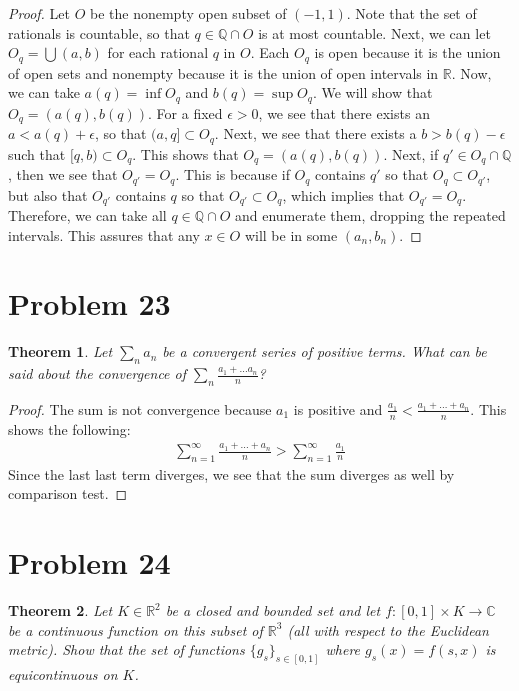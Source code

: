 \documentclass[psamsfonts]{amsart}
\newtheorem{thm}{Theorem}[section]
\theoremstyle{definition}
\theoremstyle{remark}
\numberwithin{equation}{section}
\begin{document}
\begin{proof}
Let $O$ be the nonempty open subset of $(-1,1)$. Note that the set of rationals is countable, so that $q \in \mathbb{Q} \cap O$ is at most countable. Next, we can let $O_q = \bigcup (a,b)$ for each rational $q$ in $O$. Each $O_q$ is open because it is the union of open sets and nonempty because it is the union of open intervals in $\mathbb{R}$. Now, we can take $a(q) = \inf O_q$ and $b(q) = \sup O_q$. We will show that $O_q = (a(q), b(q))$. For a fixed $\epsilon > 0$, we see that there exists an $a < a(q) + \epsilon$, so that $(a,q] \subset O_q$. Next, we see that there exists a $b > b(q) - \epsilon$ such that $[q,b) \subset O_q$. This shows that $O_q = (a(q),b(q))$. Next, if $q' \in O_q \cap \mathbb{Q}$, then we see that $O_{q'} = O_q$. This is because if $O_q$ contains $q'$ so that $O_q \subset O_{q'}$, but also that $O_{q'}$ contains $q$ so that $O_{q'} \subset O_q$, which implies that $O_{q'} = O_q$. Therefore, we can take all $q \in \mathbb{Q} \cap O$ and enumerate them, dropping the repeated intervals. This assures that any $x \in O$ will be in some $(a_n,b_n)$. 
\end{proof}

\section{Problem 23}

\begin{thm}
Let $\sum_{n} a_n$ be a convergent series of positive terms. What can be said about the convergence of $\sum_{n} \frac{a_1 + \ldots a_n}{n}$?
\end{thm}

\begin{proof}
The sum is not convergence because $a_1$ is positive and $\frac{a_1}{n} < \frac{a_1 + \ldots + a_n}{n}$. This shows the following:
\begin{eqnarray}
\sum_{n=1}^\infty \frac{a_1 + \ldots + a_n}{n} > \sum_{n=1}^\infty \frac{a_1}{n} 
\end{eqnarray}
Since the last last term diverges, we see that the sum diverges as well by comparison test.
\end{proof}

\section{Problem 24}

\begin{thm}
Let $K \in \mathbb{R}^2$ be a closed and bounded set and let $f:[0,1]\times K \to \mathbb{C}$ be a continuous function on this subset of $\mathbb{R}^3$ (all with respect to the Euclidean metric). Show that the set of functions $\{g_s \}_{s \in [0,1]}$ where $g_s(x) = f(s,x)$ is equicontinuous on $K$. 
\end{thm}
\end{document}
